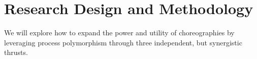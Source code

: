 \section{Research Design and Methodology}
\label{sec:research}

We will explore how to expand the power and utility of choreographies
by leveraging process polymorphism through three independent, but synergistic thrusts.





